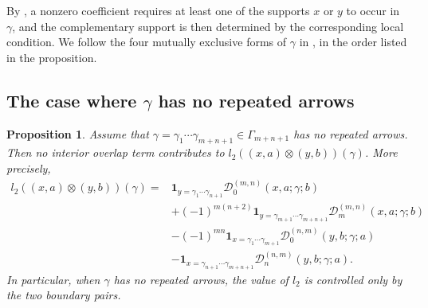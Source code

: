 \documentclass[11pt,a4paper,reqno]{amsart}
\newcommand{\mD}{\mathcal D}
\newcommand{\para}[2]{(#1,#2)}
\newcommand{\one}{\mathbf 1}
\theoremstyle{plain}
\newtheorem{proposition}[proposition]{Proposition}
\theoremstyle{definition}
\numberwithin{equation}{section}
\begin{document}
	By , a nonzero coefficient requires at least one of the supports
	$x$ or $y$ to occur in $\gamma$, and the complementary support is then
	determined by the corresponding local condition.  We follow the four
	mutually exclusive forms of $\gamma$ in , in the order
	listed in the proposition.
	\subsection{The case where \texorpdfstring{$\gamma$}{gamma} has no repeated arrows}\label{sec:higher-NRA}
	\begin{proposition}
		\label{prop:higher-no-repetition-boundary-reduction}
		Assume that
		$\gamma=\gamma_1\cdots\gamma_{m+n+1}\in\Gamma_{m+n+1}$
		has no repeated arrows. Then no interior overlap term contributes to
		$l_2(\para{x}{a}\otimes\para{y}{b})(\gamma)$.
		More precisely,
		\begin{align*}
			l_2(\para{x}{a}\otimes \para{y}{b})(\gamma)
			={}&
			\one_{y=\gamma_1\cdots\gamma_{n+1}}
			\mD_0^{(m,n)}(x,a;\gamma;b)
			\\
			&+(-1)^{m(n+2)}
			\one_{y=\gamma_{m+1}\cdots\gamma_{m+n+1}}
			\mD_m^{(m,n)}(x,a;\gamma;b)
			\\
			&-(-1)^{mn}
			\one_{x=\gamma_1\cdots\gamma_{m+1}}
			\mD_0^{(n,m)}(y,b;\gamma;a)
			\\
			&-
			\one_{x=\gamma_{n+1}\cdots\gamma_{m+n+1}}
			\mD_n^{(n,m)}(y,b;\gamma;a).
		\end{align*}
		In particular, when $\gamma$ has no repeated arrows, the value of $l_2$ is controlled only by the two boundary pairs.
	\end{proposition}
	
\end{document}
